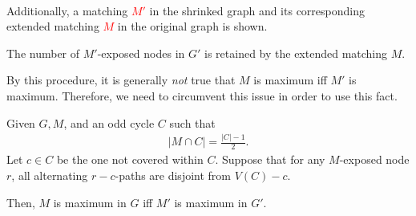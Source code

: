 \begin{example}
\begin{minipage}{\textwidth}
\begin{minipage}{0.4\textwidth}
        \end{minipage}
    \end{minipage}
    \vspace{5pt}
    \\
    Additionally, a matching \textcolor{red}{$M'$} in the shrinked graph and its corresponding
    extended matching \textcolor{red}{$M$} in the original graph is shown.
\end{example}
\begin{observe}
    The number of $M'$-exposed nodes in $G'$ is retained by the extended matching $M$.
\end{observe}
\begin{warning}
    By this procedure, it is generally \emph{not} true that $M$ is maximum iff $M'$ is maximum.
    Therefore, we need to circumvent this issue in order to use this fact.
\end{warning}
\begin{theorem}
    Given $G,M$, and an odd cycle $C$ such that
    \begin{align*}
        |M \cap C| = \frac{|C|-1}{2}.
    \end{align*}
    Let $c \in C$ be the one not covered within $C$. Suppose that for any $M$-exposed
    node $r$, all alternating $r-c$-paths are disjoint from $V(C)-c$.

    Then, $M$ is maximum in $G$ iff $M'$ is maximum in $G'$.
\end{theorem}
